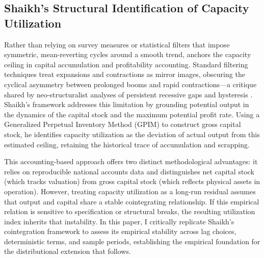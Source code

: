 \subsection{Shaikh's Structural Identification of Capacity Utilization}
\label{subsec:shaikh_structural_measurement}

Rather than relying on survey measures or statistical filters that impose symmetric, mean-reverting cycles around a smooth trend, \citet{Shaikh2016} anchors the capacity ceiling in capital accumulation and profitability accounting. Standard filtering techniques treat expansions and contractions as mirror images, obscuring the cyclical asymmetry between prolonged booms and rapid contractions---a critique shared by neo-structuralist analyses of persistent recessive gaps and hysteresis \citep{FfrenchDavis2010, FfrenchDavis2012}. Shaikh's framework addresses this limitation by grounding potential output in the dynamics of the capital stock and the maximum potential profit rate. Using a Generalized Perpetual Inventory Method (GPIM) to construct gross capital stock, he identifies capacity utilization as the deviation of actual output from this estimated ceiling, retaining the historical trace of accumulation and scrapping.

This accounting-based approach offers two distinct methodological advantages: it relies on reproducible national accounts data and distinguishes net capital stock (which tracks valuation) from gross capital stock (which reflects physical assets in operation). However, treating capacity utilization as a long-run residual assumes that output and capital share a stable cointegrating relationship. If this empirical relation is sensitive to specification or structural breaks, the resulting utilization index inherits that instability. In this paper, I critically replicate Shaikh's cointegration framework to assess its empirical stability across lag choices, deterministic terms, and sample periods, establishing the empirical foundation for the distributional extension that follows.
